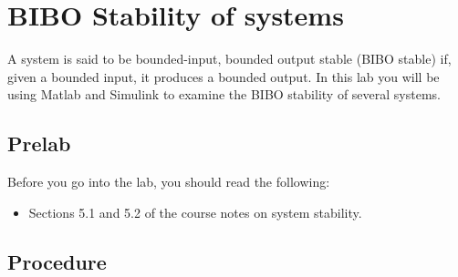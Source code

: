 \chapter{BIBO Stability of systems}\label{chap:stability}

A system is said to be bounded-input, bounded output stable (BIBO stable) if,
given a bounded input, it produces a bounded output. In this lab you will be
using \textsf{Matlab} and \textsf{Simulink} to examine the BIBO stability of
several systems.

\section{Prelab}

Before you go into the lab, you should read the following:
\begin{itemize}
\item Sections 5.1 and 5.2 of the course notes on
system stability.
\end{itemize}

\section{Procedure}

